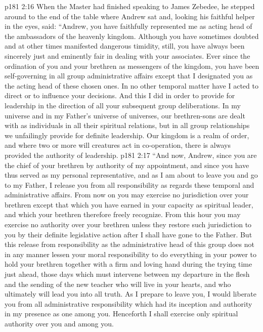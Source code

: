 \pc \vs p181 2:16 When the Master had finished speaking to James Zebedee, he stepped around to the end of the table where Andrew sat and, looking his faithful helper in the eyes, said: \textcolor{ubdarkred}{“Andrew, you have faithfully represented me as acting head of the ambassadors of the heavenly kingdom. Although you have sometimes doubted and at other times manifested dangerous timidity, still, you have always been sincerely just and eminently fair in dealing with your associates. Ever since the ordination of you and your brethren as messengers of the kingdom, you have been self\hyp{}governing in all group administrative affairs except that I designated you as the acting head of these chosen ones. In no other temporal matter have I acted to direct or to influence your decisions. And this I did in order to provide for leadership in the direction of all your subsequent group deliberations. In my universe and in my Father’s universe of universes, our brethren\hyp{}sons are dealt with as individuals in all their spiritual relations, but in all group relationships we unfailingly provide for definite leadership. Our kingdom is a realm of order, and where two or more will creatures act in co\hyp{}operation, there is always provided the authority of leadership.}
\vs p181 2:17 \textcolor{ubdarkred}{“And now, Andrew, since you are the chief of your brethren by authority of my appointment, and since you have thus served as my personal representative, and as I am about to leave you and go to my Father, I release you from all responsibility as regards these temporal and administrative affairs. From now on you may exercise no jurisdiction over your brethren except that which you have earned in your capacity as spiritual leader, and which your brethren therefore freely recognize. From this hour you may exercise no authority over your brethren unless they restore such jurisdiction to you by their definite legislative action after I shall have gone to the Father. But this release from responsibility as the administrative head of this group does not in any manner lessen your moral responsibility to do everything in your power to hold your brethren together with a firm and loving hand during the trying time just ahead, those days which must intervene between my departure in the flesh and the sending of the new teacher who will live in your hearts, and who ultimately will lead you into all truth. As I prepare to leave you, I would liberate you from all administrative responsibility which had its inception and authority in my presence as one among you. Henceforth I shall exercise only spiritual authority over you and among you.}
